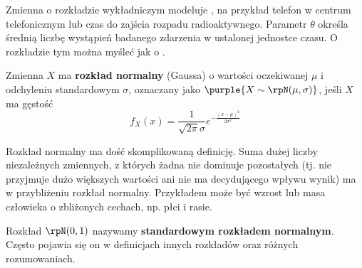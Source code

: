Zmienna o rozkładzie wykładniczym modeluje , na przykład telefon w centrum telefonicznym lub czas do zajścia rozpadu radioaktywnego. Parametr $\theta$ określa średnią liczbę wystąpień badanego zdarzenia w ustalonej jednostce czasu. O rozkładzie tym można myśleć jak o .

\begin{center}
\end{center}
\bigskip

Zmienna $X$ ma \textbf{rozkład normalny} (Gaussa) o wartości oczekiwanej $\mu$ i odchyleniu standardowym $\sigma$, oznaczany jako $\purple{X \sim \rpN(\mu, \sigma)}$, jeśli $X$ ma gęstość 
$$f_X(x) = \frac{1}{\sqrt{2\pi} \sigma} e^{-\frac{(x - \mu)^2}{2\sigma^2}}$$

Rozkład normalny ma dość skomplikowaną definicję. Suma dużej liczby niezależnych zmiennych, z których żadna nie dominuje pozostałych (tj. nie przyjmuje dużo większych wartości ani nie ma decydującego wpływu wynik) ma w przybliżeniu rozkład normalny. Przykładem może być wzrost lub masa człowieka o zbliżonych cechach, np. płci i rasie.

Rozkład $\rpN(0, 1)$ nazywamy \textbf{standardowym rozkładem normalnym}. Często pojawia się on w definicjach innych rozkładów oraz różnych rozumowaniach.

